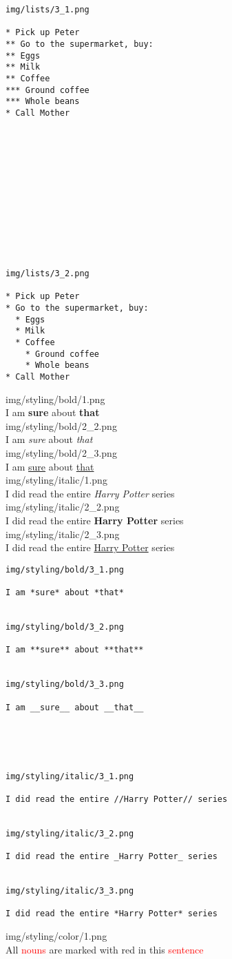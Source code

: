 \documentclass[14pt]{article}
\begin{document}
\begin{verbatim}
img/lists/3_1.png

* Pick up Peter
** Go to the supermarket, buy:
** Eggs
** Milk
** Coffee
*** Ground coffee
*** Whole beans
* Call Mother













img/lists/3_2.png

* Pick up Peter
* Go to the supermarket, buy:
  * Eggs
  * Milk
  * Coffee
    * Ground coffee
    * Whole beans
* Call Mother

\end{verbatim}
\noindent
img/styling/bold/1.png\\[.5cm]
I am \textbf{sure} about \textbf{that}\\[.5cm]
img/styling/bold/2\_2.png\\[.5cm]
I am \textit{sure} about \textit{that}\\[.5cm]
img/styling/bold/2\_3.png\\[.5cm]
I am \underline{sure} about \underline{that}\\[.5cm]
img/styling/italic/1.png\\[.5cm]
I did read the entire \textit{Harry Potter} series\\[.5cm]
img/styling/italic/2\_2.png\\[.5cm]
I did read the entire \textbf{Harry Potter} series\\[.5cm]
img/styling/italic/2\_3.png\\[.5cm]
I did read the entire \underline{Harry Potter} series\\[.5cm]



\begin{verbatim}
img/styling/bold/3_1.png

I am *sure* about *that*


img/styling/bold/3_2.png

I am **sure** about **that**


img/styling/bold/3_3.png

I am __sure__ about __that__





img/styling/italic/3_1.png

I did read the entire //Harry Potter// series


img/styling/italic/3_2.png

I did read the entire _Harry Potter_ series


img/styling/italic/3_3.png

I did read the entire *Harry Potter* series

\end{verbatim}
\noindent
img/styling/color/1.png\\[.5cm]
All \textcolor{red}{nouns} are marked with red in this \textcolor{red}{sentence}
\end{document}
